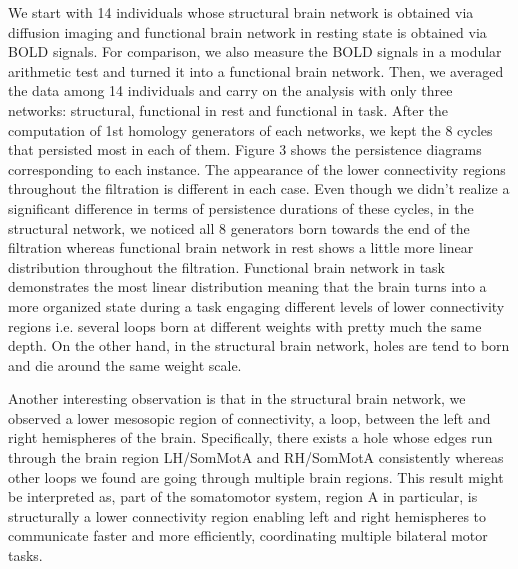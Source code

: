 \documentclass[9pt,twocolumn,twoside,lineno]{pnas-new}
\begin{document}
We start with 14 individuals whose structural brain network is obtained via diffusion imaging and functional brain network in resting state is obtained via BOLD signals. For comparison, we also measure the BOLD signals in a modular arithmetic test and turned it into a functional brain network. Then, we averaged the data among 14 individuals and carry on the analysis with only three networks: structural, functional in rest and functional in task. After the computation of 1st homology generators of each networks, we kept the 8 cycles that persisted most in each of them. Figure 3 shows the persistence diagrams corresponding to each instance. The appearance of the lower connectivity regions throughout the filtration is different in each case. Even though we didn't realize a significant difference in terms of persistence durations of these cycles, in the structural network, we noticed all 8 generators born towards the end of the filtration whereas functional brain network in rest shows a little more linear distribution throughout the filtration. Functional brain network in task demonstrates the most linear distribution meaning that the brain turns into a more organized state during a task engaging different levels of lower connectivity regions i.e. several loops born at different weights with pretty much the same depth. On the other hand, in the structural brain network, holes are tend to born and die around the same weight scale. 

Another interesting observation is that in the structural brain network, we observed a lower mesosopic region of connectivity, a loop, between the left and right hemispheres of the brain. Specifically, there exists a hole whose edges run through the brain region LH/SomMotA and RH/SomMotA consistently whereas other loops we found are going through multiple brain regions. This result might be interpreted as, part of the somatomotor system, region A in particular, is structurally a lower connectivity region enabling left and right hemispheres to communicate faster and more efficiently, coordinating multiple bilateral motor tasks.
\end{document}
